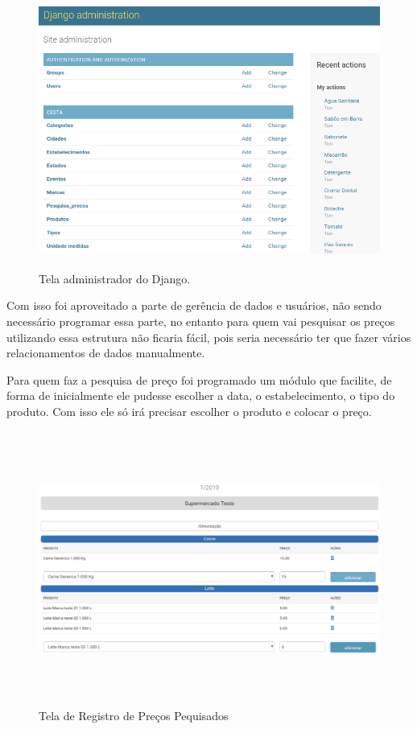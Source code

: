 \documentclass{ifto-tex}
\begin{document}
	\begin{figure}[!h]
	\begin{center}
		\includegraphics[width=16.0cm, height= 9.0cm]{cestaadmin.png}    %
		\caption{Tela administrador do Django.} 
		\label{fig:faces}
	\end{center}
\end{figure}
Com isso foi aproveitado a parte de gerência de dados e usuários, não sendo necessário programar essa parte, no entanto para quem vai pesquisar os preços utilizando essa estrutura não ficaria fácil, pois seria necessário ter que fazer vários relacionamentos de dados manualmente.

Para quem faz a pesquisa de preço foi programado um módulo que facilite, de forma de inicialmente ele pudesse escolher a data, o estabelecimento, o tipo do produto. Com isso ele só irá precisar escolher o produto e colocar o preço.

	\begin{figure}[!h]
	\begin{center}
		\includegraphics[width=16.0cm, height= 9.0cm]{cestacadastro.png}    %
		\caption{Tela de Registro de Preços Pequisados} 
		\label{fig:faces}
	\end{center}
\end{figure}
\end{document}
